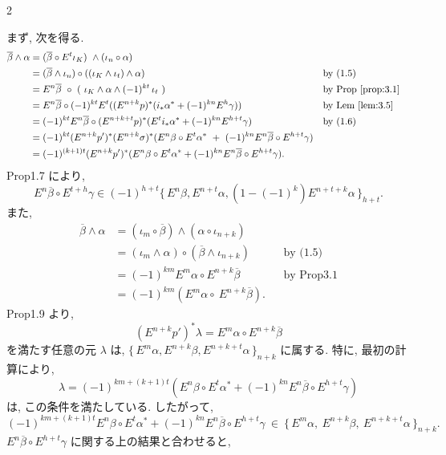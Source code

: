 \documentclass[10pt, leqno]{ltjsarticle}
\newcommand{\Ex}{E}        %
\newcommand{\todai}[2][]{\{\,#2\,\}_{#1}}      %
\newcommand{\ext}[1]{\overline{#1}}     %
\numberwithin{equation}{section}
\theoremstyle{plain}
\theoremstyle{definition}
\theoremstyle{remark}
\begin{document}
\begin{paracol}{2}

\noindent
まず, 次を得る. 
\[
\begin{align*}
\ext{\beta} \wedge \alpha
&= (\ext{\beta} \circ E^t \iota_K)\ \wedge (\iota_n \circ \alpha) \\
&= (\ext{\beta} \wedge \iota_n) \circ ((\iota_K \wedge \iota_t) \wedge \alpha)
&&\text{by (1.5)}\\
&= \Ex^{n}\ext{\beta}\ \circ\
(\ \iota_K \wedge \alpha \wedge (-1)^{kt}\,\iota_t\ )
&&\text{by Prop \ref{prop:3.1}}\\
&= E^n\ext{\beta} \circ (-1)^{kt} E^t ((E^{n+k}p)^{*}(i_*\alpha^* + (-1)^{kn}E^h \gamma))
&&\text{by Lem \ref{lem:3.5}}\\
&= (-1)^{kt}\Ex^{n}\ext{\beta}\circ(\Ex^{n+k+t}p)^{*}(\Ex^{t}i_*\alpha^* + (-1)^{kn}E^{h+t}\gamma)
&&\text{by (1.6)} \\
&= (-1)^{kt}(\Ex^{n+k}p')^{*}(E^{n+k}\sigma)^{*}
( \Ex^{n}\beta\circ\Ex^{t}\alpha^{*}
\ +\ (-1)^{kn}\Ex^{n}\ext{\beta}\circ\Ex^{h+t}\gamma )\\
&= (-1)^{(k+1)t}(E^{n+k}p')^{*}
(E^n\beta\circ E^t\alpha^* + (-1)^{kn}E^n\ext{\beta}\circ E^{h+t}\gamma) .
\end{align*}
\]
Prop1.7 により, 
\[
E^n\ext{\beta}\circ E^{t+h}\gamma
\in (-1)^{h+t}\todai[h+t]{E^n\beta, E^{n+t}\alpha, (1-(-1)^k)E^{n+t+k}\alpha} .
\]
また, 
\[
\begin{align*}
\ext{\beta} \wedge \alpha
&= (\iota_m \circ \ext{\beta}) \wedge (\alpha \circ \iota_{n+k})\\
&= (\iota_m \wedge \alpha) \circ (\ext{\beta} \wedge \iota_{n+k}) && \text{by (1.5)}\\
&= (-1)^{km}\Ex^{m}\alpha \circ \Ex^{n+k}\ext{\beta} && \text{by Prop3.1}\\
&= (-1)^{km}(\Ex^{m}\alpha \circ\ \Ex^{n+k}\ext{\beta}) .
\end{align*}
\]
Prop1.9 より, 
\[
(E^{n+k}p')^{*}\lambda = E^m\alpha\circ E^{n+k}\ext{\beta}
\]
を満たす任意の元 \(\lambda\) は, 
\(\todai[n+k]{E^m\alpha, E^{n+k}\beta, E^{n+k+t}\alpha}\)
に属する. 
特に, 最初の計算により,
\[
\lambda = (-1)^{km+(k+1)t} (\Ex^{n}\beta\circ \Ex^{t}\alpha^* 
+ (-1)^{kn}\Ex^{n}\ext{\beta}\circ \Ex^{h+t}\gamma)
\]
は, この条件を満たしている. 
したがって, 
\[
(-1)^{km+(k+1)t}\Ex^{n}\beta\circ \Ex^{t}\alpha^{*}
+(-1)^{kn}\Ex^{n}\ext{\beta}\circ \Ex^{h+t}\gamma
\ \in\
\todai[n+k]{\Ex^{m}\alpha,\ \Ex^{n+k}\beta,\ \Ex^{n+k+t}\alpha}.
\]
\(\Ex^{n}\ext{\beta}\circ \Ex^{h+t}\gamma\)
に関する上の結果と合わせると, 

\end{paracol}
\end{document}
